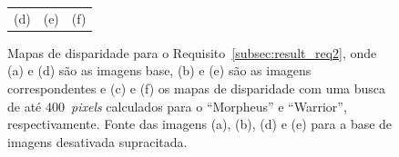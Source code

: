 \begin{figure}[!ht]
\begin{tabular}{ccc}
        (d)&(e)&(f)
    \end{tabular}
    \caption{Mapas de disparidade para o Requisito~\ref{subsec:result_req2}, onde (a) e (d) são as imagens base, (b) e (e) são as imagens correspondentes e (c) e (f) os mapas de disparidade com uma busca de até $400$~\emph{pixels} calculados para o ``Morpheus'' e ``Warrior'', respectivamente. Fonte das imagens (a), (b), (d) e (e) para a base de imagens desativada supracitada.}
    \label{fig:result_req2_disp_map}
\end{figure}

